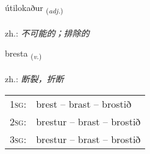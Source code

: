 \documentclass[frontgrid, backgrid]{flacards}\usepackage[]{graphicx}\usepackage[]{xcolor}
\begin{document}
\renewcommand{\flhead}{\vskip5pt \fboxsep=0pt {\small\bfseries\footnotesize Lýsingarorð | 形容词}}
\renewcommand{\fcfoot}{\vskip5pt \fboxsep=0pt \hspace{2pt}{\small\bfseries\footnotesize 3K}}

\renewcommand{\blhead}{\vskip5pt {\small\bfseries\footnotesize Lýsingarorð | 形容词 }}
\renewcommand{\bcfoot}{\vskip5pt \hspace{2pt}{\small\bfseries\footnotesize 3K}}


{útilokaður \small{\textsubscript{(\textit{adj.})}} \\[1ex] %
\textphonetic{[uːtɪlɔkaðʏr]} \\
zh.: \emph{不可能的；排除的} \\  [2ex]
\renewcommand*{\arraystretch}{0.8}
}

\renewcommand{\flhead}{\vskip5pt \fboxsep=0pt {\small\bfseries\footnotesize Sagnorð | 动词}}
\renewcommand{\fcfoot}{\vskip5pt \fboxsep=0pt \hspace{2pt}{\small\bfseries\footnotesize 3K}}

\renewcommand{\blhead}{\vskip5pt {\small\bfseries\footnotesize Sagnorð | 动词 }}
\renewcommand{\bcfoot}{\vskip5pt \hspace{2pt}{\small\bfseries\footnotesize 3K}}


{bresta \small{\textsubscript{(\textit{v.})}} \\[1ex] %
\textphonetic{[prɛsta]} \\
zh.: \emph{断裂，折断} \\  [2ex]
\renewcommand*{\arraystretch}{0.8}
\begin{tabular}{p{1cm}l}
\textsc{1sg}: & brest -- brast -- brostið \\ 
\textsc{2sg}: & brestur -- brast -- brostið \\ 
\textsc{3sg}: & brestur -- brast -- brostið \\ 
\end{tabular}
}
\end{document}
